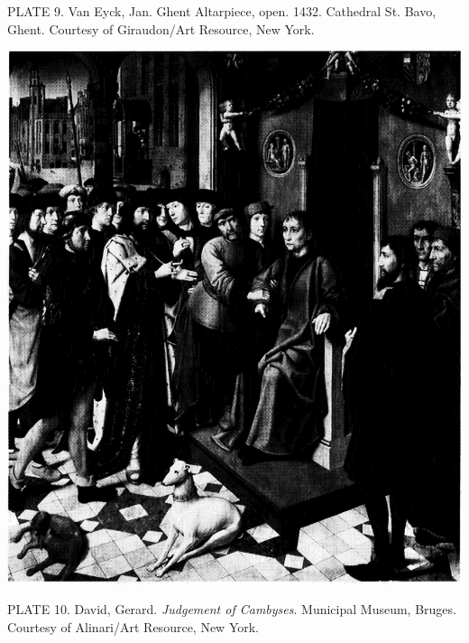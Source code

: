 PLATE 9. Van Eyck, Jan. Ghent Altarpiece, open. 1432. Cathedral St.
Bavo, Ghent. Courtesy of Giraudon/Art Resource, New York.

\protect\hypertarget{20_ILLUSTRATIONS_FOLLOW_PAGE.xhtmlux5cux23id_10}{}{}\includegraphics{include/html/images/330_1.png}

PLATE 10. David, Gerard. \emph{Judgement of Cambyses}. Municipal Museum,
Bruges. Courtesy of Alinari/Art Resource, New York.

